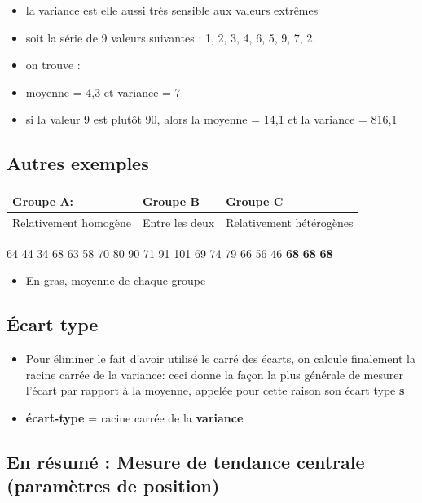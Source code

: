 \documentclass[
]{article}
\providecommand{\tightlist}{%
  \setlength{\itemsep}{0pt}\setlength{\parskip}{0pt}}
\begin{document}
\begin{itemize}
\tightlist
\item
  la variance est elle aussi très sensible aux valeurs extrêmes
\item
  soit la série de 9 valeurs suivantes : 1, 2, 3, 4, 6, 5, 9, 7, 2.
\item
  on trouve :
\item
  moyenne = 4,3 et variance = 7
\item
  si la valeur 9 est plutôt 90, alors la moyenne = 14,1 et la variance =
  816,1
\end{itemize}

\hypertarget{autres-exemples}{%
\subsection{Autres exemples}\label{autres-exemples}}

\begin{longtable}[]{@{}lll@{}}
\toprule()
Groupe A: & Groupe B & Groupe C \\
\midrule()
\endhead
Relativement homogène & Entre les deux & Relativement hétérogènes \\
\bottomrule()
\end{longtable}

64 44 34 68 63 58 70 80 90 71 91 101 69 74 79 66 56 46 \textbf{68}
\textbf{68} \textbf{68}

\begin{itemize}
\tightlist
\item
  En gras, moyenne de chaque groupe
\end{itemize}

\hypertarget{uxe9cart-type}{%
\subsection{Écart type}\label{uxe9cart-type}}

\begin{itemize}
\item
  Pour éliminer le fait d'avoir utilisé le carré des écarts, on calcule
  finalement la racine carrée de la variance: ceci donne la façon la
  plus générale de mesurer l'écart par rapport à la moyenne, appelée
  pour cette raison son écart type \textbf{s}
\item
  \textbf{écart-type} = racine carrée de la \textbf{variance}
\end{itemize}

\hypertarget{en-ruxe9sumuxe9-mesure-de-tendance-centrale-paramuxe8tres-de-position}{%
\subsection{En résumé : Mesure de tendance centrale (paramètres de
position)}\label{en-ruxe9sumuxe9-mesure-de-tendance-centrale-paramuxe8tres-de-position}}
\end{document}
